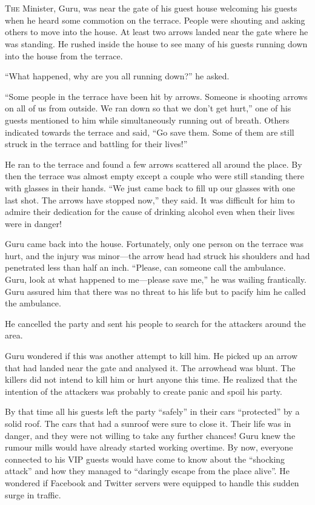 \chapter{}

\lettrine{T}{he} Minister, Guru, was near the gate of his guest house welcoming his guests
when he heard some commotion on the terrace. People were shouting and asking
others to move into the house. At least two arrows landed near the gate where he
was standing. He rushed inside the house to see many of his guests running down
into the house from the terrace.

“What happened, why are you all running down?” he asked.

“Some people in the terrace have been hit by arrows. Someone is shooting arrows
on all of us from outside. We ran down so that we don't get hurt,” one of his
guests mentioned to him while simultaneously running out of breath. Others
indicated towards the terrace and said, “Go save them. Some of them are still
struck in the terrace and battling for their lives!”

He ran to the terrace and found a few arrows scattered all around the place. By
then the terrace was almost empty except a couple who were still standing there
with glasses in their hands. “We just came back to fill up our glasses with one
last shot. The arrows have stopped now,” they said. It was difficult for him to
admire their dedication for the cause of drinking alcohol even when their lives
were in danger!

Guru came back into the house. Fortunately, only one person on the terrace was
hurt, and the injury was minor—the arrow head had struck his shoulders and
had penetrated less than half an inch. “Please, can someone call the
ambulance. Guru, look at what happened to me—please save me,” he was wailing
frantically. Guru assured him that there was no threat to his life but to pacify
him he called the ambulance.

He cancelled the party and sent his people to search for the attackers around the
area.

Guru wondered if this was another attempt to kill him. He picked up an arrow
that had landed near the gate and analysed it. The arrowhead was blunt. The
killers did not intend to kill him or hurt anyone this time. He realized that
the intention of the attackers was probably to create panic and spoil his party.

By that time all his guests left the party “safely” in their cars “protected” by
a solid roof. The cars that had a sunroof were sure to close it. Their life was
in danger, and they were not willing to take any further chances! Guru knew the
rumour mills would have already started working overtime. By now, everyone
connected to his VIP guests would have come to know about the “shocking attack”
and how they managed to “daringly escape from the place alive”. He wondered if
Facebook and Twitter servers were equipped to handle this sudden surge in
traffic.

